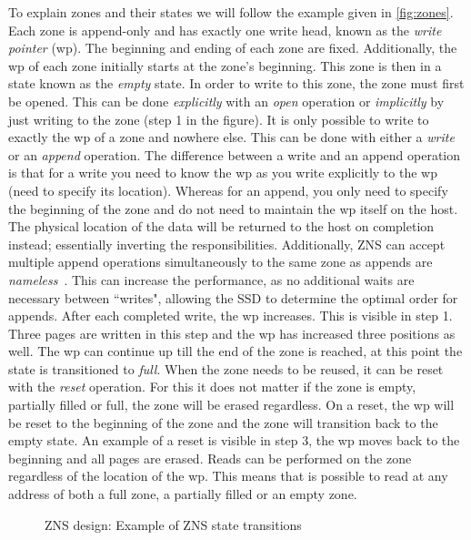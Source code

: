 To explain zones and their states we will follow the example given in \autoref{fig:zones}. Each zone is append-only and has exactly one write head, known as the \textit{write pointer} (wp). The beginning and ending of each zone are fixed. Additionally, the wp of each zone initially starts at the zone's beginning. This zone is then in a state known as the \textit{empty} state. In order to write to this zone, the zone must first be opened. This can be done \textit{explicitly} with an \textit{open} operation or \textit{implicitly} by just writing to the zone (step 1 in the figure). It is only possible to write to exactly the wp of a zone and nowhere else. This can be done with either a \textit{write} or an \textit{append} operation. The difference between a write and an append operation is that for a write you need to know the wp as you write explicitly to the wp (need to specify its location). Whereas for an append, you only need to specify the beginning of the zone and do not need to maintain the wp itself on the host. The physical location of the data will be returned to the host on completion instead; essentially inverting the responsibilities. Additionally, ZNS can accept multiple append operations simultaneously to the same zone as appends are \textit{nameless}~\cite{maheshwari2021blocks}. This can increase the performance, as no additional waits are necessary between ``writes", allowing the SSD to determine the optimal order for appends. After each completed write, the wp increases. This is visible in step 1. Three pages are written in this step and the wp has increased three positions as well. The wp can continue up till the end of the zone is reached, at this point the state is transitioned to \textit{full}. When the zone needs to be reused, it can be reset with the \textit{reset} operation. For this it does not matter if the zone is empty, partially filled or full, the zone will be erased regardless. On a reset, the wp will be reset to the beginning of the zone and the zone will transition back to the empty state. An example of a reset is visible in step 3, the wp moves back to the beginning and all pages are erased. Reads can be performed on the zone regardless of the location of the wp. This means that is possible to read at any address of both a full zone, a partially filled or an empty zone.
\begin{figure}[h]
\centering
\begin{minipage}{0.95\textwidth}
  \centering
  
\end{minipage}%
\caption{ ZNS design: Example of ZNS state transitions }
\label{fig:zones}
\end{figure}\\
